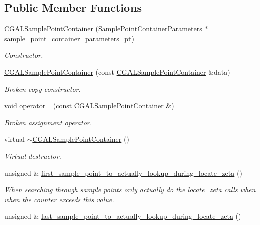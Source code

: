 \subsection*{Public Member Functions}
\begin{DoxyCompactItemize}
\item 
\hyperlink{classCGALSamplePointContainer_a3b81406803832597ce1dcb93d3383e9e}{C\+G\+A\+L\+Sample\+Point\+Container} (Sample\+Point\+Container\+Parameters $\ast$sample\+\_\+point\+\_\+container\+\_\+parameters\+\_\+pt)
\begin{DoxyCompactList}\small\item\em Constructor. \end{DoxyCompactList}\item 
\hyperlink{classCGALSamplePointContainer_aacc2148f5ee065a747dce7f79281f7c8}{C\+G\+A\+L\+Sample\+Point\+Container} (const \hyperlink{classCGALSamplePointContainer}{C\+G\+A\+L\+Sample\+Point\+Container} \&data)
\begin{DoxyCompactList}\small\item\em Broken copy constructor. \end{DoxyCompactList}\item 
void \hyperlink{classCGALSamplePointContainer_a69c6087a749139e0f4d575c9d24356a2}{operator=} (const \hyperlink{classCGALSamplePointContainer}{C\+G\+A\+L\+Sample\+Point\+Container} \&)
\begin{DoxyCompactList}\small\item\em Broken assignment operator. \end{DoxyCompactList}\item 
virtual \hyperlink{classCGALSamplePointContainer_a819dabe5571c94a545ef200d6fa09383}{$\sim$\+C\+G\+A\+L\+Sample\+Point\+Container} ()
\begin{DoxyCompactList}\small\item\em Virtual destructor. \end{DoxyCompactList}\item 
unsigned \& \hyperlink{classCGALSamplePointContainer_abc24c27b40b502df4a57527fc35c2a15}{first\+\_\+sample\+\_\+point\+\_\+to\+\_\+actually\+\_\+lookup\+\_\+during\+\_\+locate\+\_\+zeta} ()
\begin{DoxyCompactList}\small\item\em When searching through sample points only actually do the locate\+\_\+zeta calls when when the counter exceeds this value. \end{DoxyCompactList}\item 
unsigned \& \hyperlink{classCGALSamplePointContainer_a568d1e098b2e76e7871a60aced767db6}{last\+\_\+sample\+\_\+point\+\_\+to\+\_\+actually\+\_\+lookup\+\_\+during\+\_\+locate\+\_\+zeta} ()

\end{DoxyCompactItemize}
